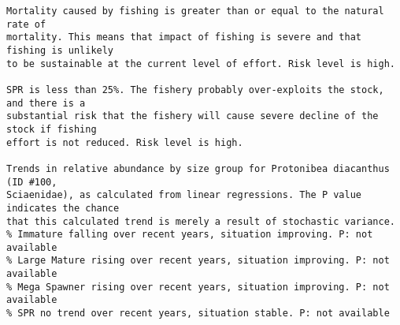 \documentclass{report}\usepackage[]{graphicx}\usepackage[]{color}
\makeatletter
\newenvironment{kframe}{%
 \def\at@end@of@kframe{}%
 \ifinner\ifhmode%
  \def\at@end@of@kframe{\end{minipage}}%
  \begin{minipage}{\columnwidth}%
 \fi\fi%
 \def\FrameCommand##1{\hskip\@totalleftmargin \hskip-\fboxsep
 \colorbox{shadecolor}{##1}\hskip-\fboxsep
     \hskip-\linewidth \hskip-\@totalleftmargin \hskip\columnwidth}%
 \MakeFramed {\advance\hsize-\width
   \@totalleftmargin\z@ \linewidth\hsize
   \@setminipage}}%
 {\par\unskip\endMakeFramed%
 \at@end@of@kframe}
\newenvironment{knitrout}{}{} %
\makeatother
\begin{document}
\begin{knitrout}
\begin{kframe}
\begin{verbatim}
Mortality caused by fishing is greater than or equal to the natural rate of
mortality. This means that impact of fishing is severe and that fishing is unlikely
to be sustainable at the current level of effort. Risk level is high.
 
SPR is less than 25%. The fishery probably over-exploits the stock, and there is a
substantial risk that the fishery will cause severe decline of the stock if fishing
effort is not reduced. Risk level is high.
 
Trends in relative abundance by size group for Protonibea diacanthus (ID #100,
Sciaenidae), as calculated from linear regressions. The P value indicates the chance
that this calculated trend is merely a result of stochastic variance.
% Immature falling over recent years, situation improving. P: not available
% Large Mature rising over recent years, situation improving. P: not available
% Mega Spawner rising over recent years, situation improving. P: not available
% SPR no trend over recent years, situation stable. P: not available
\end{verbatim}
\end{kframe}
\end{knitrout}
\end{document}
